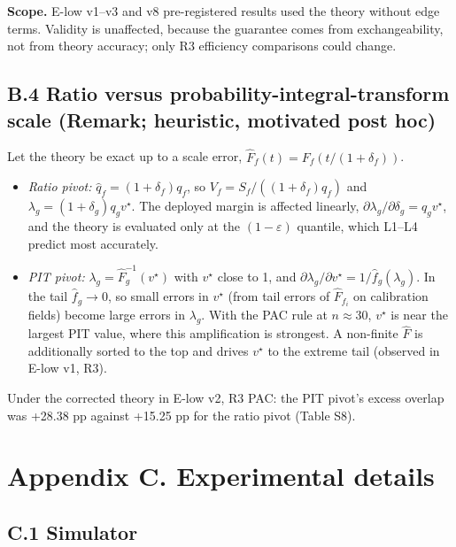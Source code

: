 \documentclass[preprint,12pt,authoryear]{elsarticle}
\providecommand{\tightlist}{\setlength{\itemsep}{0pt}\setlength{\parskip}{0pt}}
\begin{document}
\textbf{Scope.} E-low v1--v3 and v8 pre-registered results used the theory without edge terms. Validity is unaffected, because the guarantee comes from exchangeability, not from theory accuracy; only R3 efficiency comparisons could change.

\subsection*{B.4 Ratio versus probability-integral-transform scale (Remark; heuristic, motivated post hoc)}

Let the theory be exact up to a scale error, \(\hat F_f(t)=F_f(t/(1+\delta_f))\).

\begin{itemize}
\tightlist
\item
  \emph{Ratio pivot:} \(\hat q_f=(1+\delta_f)q_f\), so \(V_f=S_f/((1+\delta_f)q_f)\) and \(\lambda_g=(1+\delta_g)q_gv^\star\). The deployed margin is affected linearly, \(\partial\lambda_g/\partial\delta_g=q_gv^\star\), and the theory is evaluated only at the \((1-\varepsilon)\) quantile, which L1--L4 predict most accurately.
\item
  \emph{PIT pivot:} \(\lambda_g=\hat F_g^{-1}(v^\star)\) with \(v^\star\) close to 1, and \(\partial\lambda_g/\partial v^\star=1/\hat f_g(\lambda_g)\). In the tail \(\hat f_g\to0\), so small errors in \(v^\star\) (from tail errors of \(\hat F_{f_i}\) on calibration fields) become large errors in \(\lambda_g\). With the PAC rule at \(n\approx30\), \(v^\star\) is near the largest PIT value, where this amplification is strongest. A non-finite \(\hat F\) is additionally sorted to the top and drives \(v^\star\) to the extreme tail (observed in E-low v1, R3).
\end{itemize}

Under the corrected theory in E-low v2, R3 PAC: the PIT pivot's excess overlap was +28.38 pp against +15.25 pp for the ratio pivot (Table S8).

\section*{Appendix C. Experimental details}

\subsection*{C.1 Simulator}
\end{document}
